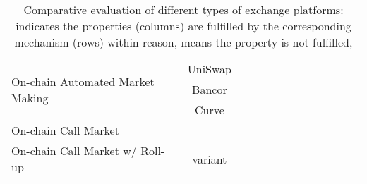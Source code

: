 \begin{table*}[t]
\begin{tabular}{|l|c|p{0.4cm}|p{0.4cm}|p{0.4cm}|p{0.4cm}|p{0.4cm}|p{0.4cm}|p{0.4cm}|p{0.4cm}|p{0.4cm}|p{0.4cm}|p{0.4cm}|}
\multirow{3}{*}{On-chain Automated Market Making}	&UniSwap	&\multirow{3}{*}{\full}		&\multirow{3}{*}{\full }		&\multirow{3}{*}{ \full}		&\multirow{3}{*}{\empt}		&\multirow{3}{*}{ \full}		&\multirow{3}{*}{\empt} 		&\multirow{3}{*}{\empt}		&\multirow{3}{*}{ \full}		&\multirow{3}{*}{\empt}		&\multirow{3}{*}{\empt}		&\multirow{3}{*}{ \full} 		\\ 
							                      	&Bancor	& 						&						&						&						&						&						&						&						&						& 						&						\\
										&Curve     	& 						&						&						&						&						&						&						&						&						& 						&						\\ \hline			

\multirow{1}{*}{On-chain Call Market}    			&\cm			&\multirow{1}{*}{\full}		&\multirow{1}{*}{\full}		&\multirow{1}{*}{\full}		&\multirow{1}{*}{\full}		&\multirow{1}{*}{\full}		&\multirow{1}{*}{\empt} 		&\multirow{1}{*}{\empt}		&\multirow{1}{*}{\empt}		&\multirow{1}{*}{\full}		&\multirow{1}{*}{ \full}		&\multirow{1}{*}{\full } 		\\ \hline

\multirow{1}{*}{On-chain Call Market w/ Roll-up}	&\cm	 variant	&\multirow{1}{*}{\full}		&\multirow{1}{*}{\full}		&\multirow{1}{*}{\empt}		&\multirow{1}{*}{\full}		&\multirow{1}{*}{\empt}		&\multirow{1}{*}{\prt} 		&\multirow{1}{*}{\prt}		&\multirow{1}{*}{\empt}		&\multirow{1}{*}{\full}		&\multirow{1}{*}{ \full}		&\multirow{1}{*}{\full } 		\\ \hline


\hline


\end{tabular}
\caption{\footnotesize{Comparative evaluation of different types of exchange platforms: {\full} indicates the properties (columns) are fulfilled by the corresponding mechanism (rows) within reason, {\empt} means the property is not fulfilled, }
\label{tab:eval}}
\end{table*}

	